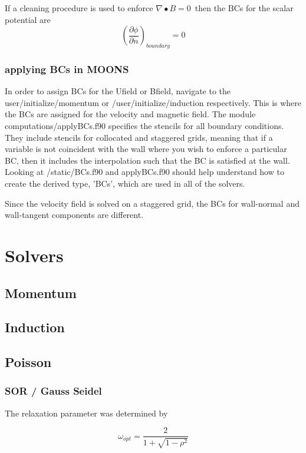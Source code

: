 \documentclass[11pt]{article}
\newcommand{\divBz}{$\nabla \bullet B = 0$}
\begin{document}
If a cleaning procedure is used to enforce \divBz\, then the BCs for the scalar potential are
\begin{equation*}
\left(\frac{\partial \phi}{\partial n} \right)_{boundary} = 0
\end{equation*}

\subsubsection{applying BCs in MOONS}
In order to assign BCs for the Ufield or Bfield, navigate to the user/initialize/momentum or /user/initialize/induction respectively. This is where the BCs are assigned for the velocity and magnetic field. The module computations/applyBCs.f90 specifies the stencils for all boundary conditions. They include stencils for collocated and staggered grids, meaning that if a variable is not coincident with the wall where you wish to enforce a particular BC, then it includes the interpolation such that the BC is satisfied at the wall. Looking at /static/BCs.f90 and applyBCs.f90 should help understand how to create the derived type, 'BCs', which are used in all of the solvers.

Since the velocity field is solved on a staggered grid, the BCs for wall-normal and wall-tangent components are different.

\section{Solvers}
\subsection{Momentum}
\subsection{Induction}
\subsection{Poisson}
\subsubsection{SOR / Gauss Seidel}
The relaxation parameter was determined by

\begin{equation} \label{eq:RelaxationParam}
\omega_{opt} = \frac{2}{1 + \sqrt{1 - \rho^2}}
\end{equation}
\end{document}
